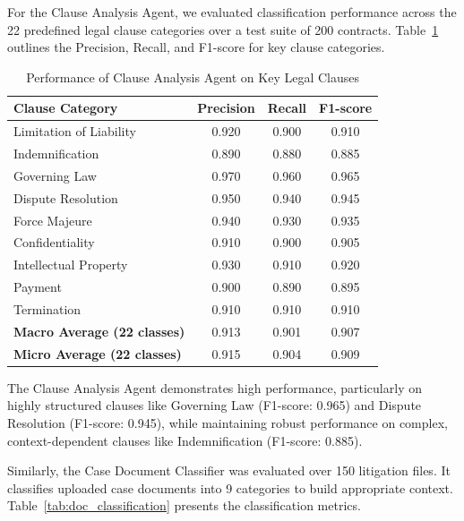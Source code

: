 For the Clause Analysis Agent, we evaluated classification performance across the 22 predefined legal clause categories over a test suite of 200 contracts. Table~\ref{tab:clause_performance} outlines the Precision, Recall, and F1-score for key clause categories.

\begin{table}[htbp]
\centering
\caption{Performance of Clause Analysis Agent on Key Legal Clauses}
\label{tab:clause_performance}
\begin{tabular}{lccc}
\hline
\textbf{Clause Category} & \textbf{Precision} & \textbf{Recall} & \textbf{F1-score} \\ \hline
Limitation of Liability   & 0.920 & 0.900 & 0.910 \\
Indemnification           & 0.890 & 0.880 & 0.885 \\
Governing Law             & 0.970 & 0.960 & 0.965 \\
Dispute Resolution        & 0.950 & 0.940 & 0.945 \\
Force Majeure             & 0.940 & 0.930 & 0.935 \\
Confidentiality           & 0.910 & 0.900 & 0.905 \\
Intellectual Property     & 0.930 & 0.910 & 0.920 \\
Payment                   & 0.900 & 0.890 & 0.895 \\
Termination               & 0.910 & 0.910 & 0.910 \\ \hline
\textbf{Macro Average (22 classes)} & 0.913 & 0.901 & 0.907 \\
\textbf{Micro Average (22 classes)} & 0.915 & 0.904 & 0.909 \\ \hline
\end{tabular}
\end{table}

The Clause Analysis Agent demonstrates high performance, particularly on highly structured clauses like Governing Law (F1-score: 0.965) and Dispute Resolution (F1-score: 0.945), while maintaining robust performance on complex, context-dependent clauses like Indemnification (F1-score: 0.885).

Similarly, the Case Document Classifier was evaluated over 150 litigation files. It classifies uploaded case documents into 9 categories to build appropriate context. Table~\ref{tab:doc_classification} presents the classification metrics.

